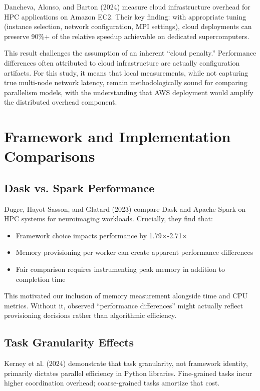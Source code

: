 Dancheva, Alonso, and Barton (2024) \cite{dancheva2024cloud} measure cloud infrastructure overhead for HPC applications on Amazon EC2. Their key finding: with appropriate tuning (instance selection, network configuration, MPI settings), cloud deployments can preserve 90\%+ of the relative speedup achievable on dedicated supercomputers.

This result challenges the assumption of an inherent ``cloud penalty.'' Performance differences often attributed to cloud infrastructure are actually configuration artifacts. For this study, it means that local measurements, while not capturing true multi-node network latency, remain methodologically sound for comparing parallelism models, with the understanding that AWS deployment would amplify the distributed overhead component.

\section{Framework and Implementation Comparisons}

\subsection{Dask vs. Spark Performance}

Dugre, Hayot-Sasson, and Glatard (2023) \cite{dugre2023performance} compare Dask and Apache Spark on HPC systems for neuroimaging workloads. Crucially, they find that:

\begin{itemize}
    \item Framework choice impacts performance by 1.79×-2.71×
    \item Memory provisioning per worker can create apparent performance differences
    \item Fair comparison requires instrumenting peak memory in addition to completion time
\end{itemize}

This motivated our inclusion of memory measurement alongside time and CPU metrics. Without it, observed ``performance differences'' might actually reflect provisioning decisions rather than algorithmic efficiency.

\subsection{Task Granularity Effects}

Kerney et al. (2024) \cite{kerney2024towards} demonstrate that task granularity, not framework identity, primarily dictates parallel efficiency in Python libraries. Fine-grained tasks incur higher coordination overhead; coarse-grained tasks amortize that cost.

